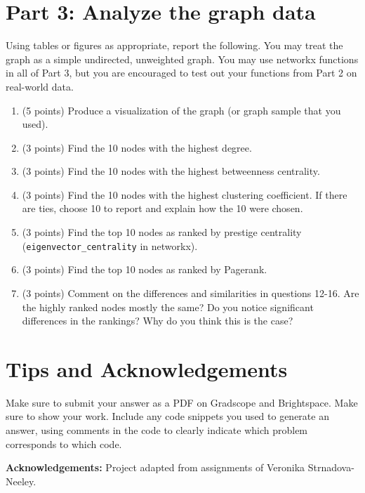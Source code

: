 \documentclass[11pt]{article}
\begin{document}
\section*{Part 3: Analyze the graph data}

Using tables or figures as appropriate, report the following.  You may treat the
graph as a simple undirected, unweighted graph. You may use networkx functions
in all of Part 3, but you are encouraged to test out your functions from Part 2
on real-world data.

\begin{enumerate}

    \item (5 points) Produce a visualization of the graph (or graph sample that
    you used).

    \item (3 points) Find the 10 nodes with the highest degree.

    \item (3 points) Find the 10 nodes with the highest betweenness centrality.

    \item (3 points) Find the 10 nodes with the highest clustering coefficient.
    If there are ties, choose 10 to report and explain how the 10 were chosen.

    \item (3 points) Find the top 10 nodes as ranked by prestige centrality
    ({\tt eigenvector\_centrality} in networkx).

    \item (3 points) Find the top 10 nodes as ranked by Pagerank.

    \item (3 points) Comment on the differences and similarities in questions
    12-16. Are the highly ranked nodes mostly the same? Do you notice
    significant differences in the rankings? Why do you think this is the case?

\end{enumerate}

\section*{Tips and Acknowledgements}

Make sure to submit your answer as a PDF on Gradscope and Brightspace. Make sure
to show your work. Include any code snippets you used to generate an answer,
using comments in the code to clearly indicate which problem corresponds to
which code.

{\bf Acknowledgements:} Project adapted from assignments of Veronika
Strnadova-Neeley.
\end{document}
